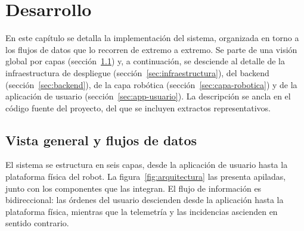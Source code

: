
\chapter{Desarrollo}
\label{cap:desarrollo}

En este capítulo se detalla la implementación del sistema, organizada en torno a
los flujos de datos que lo recorren de extremo a extremo. Se parte de una visión
global por capas (sección~\ref{sec:vision-flujos}) y, a continuación, se desciende
al detalle de la infraestructura de despliegue (sección~\ref{sec:infraestructura}),
del backend (sección~\ref{sec:backend}), de la capa robótica
(sección~\ref{sec:capa-robotica}) y de la aplicación de usuario
(sección~\ref{sec:app-usuario}). La descripción se ancla en el código fuente del
proyecto, del que se incluyen extractos representativos.

\section{Vista general y flujos de datos}
\label{sec:vision-flujos}

El sistema se estructura en seis capas, desde la aplicación de usuario hasta la
plataforma física del robot. La figura~\ref{fig:arquitectura} las presenta
apiladas, junto con los componentes que las integran. El flujo de información es
bidireccional: las órdenes del usuario descienden desde la aplicación hasta la
plataforma física, mientras que la telemetría y las incidencias ascienden en
sentido contrario.

